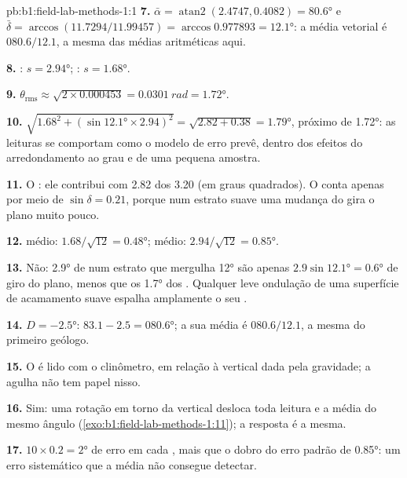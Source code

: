 \begin{solution}{pb:b1:field-lab-methods-1:1}
\textbf{7.} $\bar\alpha = \operatorname{atan2}(2.4747, 0.4082) = \ang{80.6}$
e $\bar\delta = \arccos(11.7294/11.99457) = \arccos 0.977893 = \ang{12.1}$:
a média vetorial é $080.6/12.1$, a mesma das médias aritméticas aqui.

\textbf{8.} : $s = \ang{2.94}$; : $s = \ang{1.68}$.

\textbf{9.} $\theta_{\text{rms}} \approx \sqrt{2\times0.000453} =
\qty{0.0301}{rad} = \ang{1.72}$.

\textbf{10.} $\sqrt{1.68^2 + (\sin\ang{12.1}\times2.94)^2} = \sqrt{2.82 +
0.38} = \ang{1.79}$, próximo de \ang{1.72}: as leituras se comportam como o modelo de erro prevê, dentro dos efeitos do arredondamento ao grau e de uma pequena amostra.

\textbf{11.} O : ele contribui com 2.82 dos 3.20 (em graus quadrados).
O  conta apenas por meio de $\sin\delta = 0.21$, porque num estrato suave uma mudança do  gira o plano muito pouco.

\textbf{12.}  médio: $1.68/\sqrt{12} = \ang{0.48}$;  médio:
$2.94/\sqrt{12} = \ang{0.85}$.

\textbf{13.} Não: \ang{2.9} de  num estrato que mergulha \ang{12} são apenas
$2.9\sin\ang{12.1} = \ang{0.6}$ de giro do plano, menos que os \ang{1.7} dos . Qualquer leve ondulação de uma superfície de acamamento suave espalha amplamente o seu .

\textbf{14.} $D = \ang{-2.5}$: $83.1 - 2.5 = \ang{080.6}$; a sua média é
$080.6/12.1$, a mesma do primeiro geólogo.

\textbf{15.} O  é lido com o clinômetro, em relação à vertical dada pela gravidade; a agulha não tem papel nisso.

\textbf{16.} Sim: uma rotação em torno da vertical desloca toda leitura e a média do mesmo ângulo (\cref{exo:b1:field-lab-methods-1:11}); a resposta é a mesma.

\textbf{17.} $10\times0.2 = \ang{2}$ de erro em cada , mais que o dobro do erro padrão de \ang{0.85}: um erro sistemático que a média não consegue detectar.


\end{solution}
